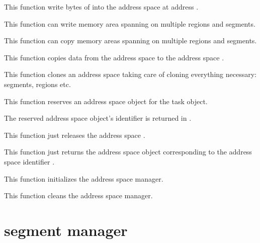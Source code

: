 	 {
	   This function write  bytes of 
	   into the address space  at address .

	   This function can write memory area spanning on multiple
	   regions and segments.

	 }

	 {
	   This function can copy memory areas spanning on multiple
	   regions and segments.

	   This function copies data from the address space
	    to the address space .
	 }

	 {
	   This function clones an address space taking care of cloning
	   everything necessary: segments, regions etc.
	 }

	 {
	   This function reserves an address space object for the
	   task  object.

	   The reserved address space object's identifier is returned
	   in .
	 }

	 {
	   This function just releases the address space .
	 }

	 {
	   This function just returns the address space object
	   corresponding to the address space identifier .
	 }

	 {
	   This function initializes the address space manager.
	 }

	 {
	   This function cleans the address space manager.
	 }

%
%

\section{segment manager}

